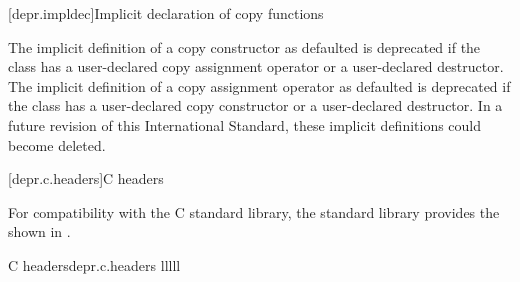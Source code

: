 [depr.impldec]{Implicit declaration of copy functions}

\pnum
The implicit definition of a copy constructor
as defaulted is deprecated if the class has
a user-declared copy assignment operator or
a user-declared destructor.
The implicit definition of a copy assignment operator
as defaulted is deprecated if the class has
a user-declared copy constructor or
a user-declared destructor.
In a future revision of this International Standard, these implicit definitions
could become deleted.

[depr.c.headers]{C headers}

\pnum
For compatibility with the
%
C standard library, the \Cpp{} standard library provides
the  shown in .

\begin{multicolfloattable}{C headers}{depr.c.headers}
{lllll}
 \\
 \\
 \\
 \\
 \\
 \\
\columnbreak
{} \\
 \\
 \\
 \\
 \\
 \\
\columnbreak
{} \\
 \\
 \\
 \\
 \\
 \\
\columnbreak
{} \\
 \\
 \\
 \\
 \\
 \\
\columnbreak
{} \\
 \\
\end{multicolfloattable}

